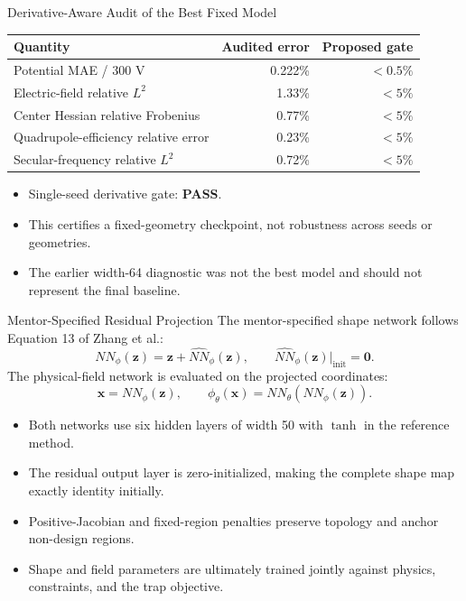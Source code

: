 \documentclass[aspectratio=169,professionalfonts]{beamer}
\begin{document}
\begin{frame}[t]{Derivative-Aware Audit of the Best Fixed Model}
\small
\begin{tabular}{lrr}
\toprule
Quantity & Audited error & Proposed gate \\
\midrule
Potential MAE / 300 V & 0.222\% & $<0.5\%$ \\
Electric-field relative $L^2$ & 1.33\% & $<5\%$ \\
Center Hessian relative Frobenius & 0.77\% & $<5\%$ \\
Quadrupole-efficiency relative error & 0.23\% & $<5\%$ \\
Secular-frequency relative $L^2$ & 0.72\% & $<5\%$ \\
\bottomrule
\end{tabular}
\vspace{0.12in}
\begin{itemize}
\item Single-seed derivative gate: \textbf{PASS}.
\item This certifies a fixed-geometry checkpoint, not robustness across seeds or geometries.
\item The earlier width-64 diagnostic was not the best model and should not represent the final baseline.
\end{itemize}
\end{frame}

\begin{frame}[t]{Mentor-Specified Residual Projection}
The mentor-specified shape network follows Equation 13 of Zhang et al.:
\[
NN_\phi(\mathbf{z})=\mathbf{z}+\widehat{NN}_\phi(\mathbf{z}),
\qquad
\widehat{NN}_\phi(\mathbf{z})\big|_{\mathrm{init}}=\mathbf{0}.
\]
The physical-field network is evaluated on the projected coordinates:
\[
\mathbf{x}=NN_\phi(\mathbf{z}),
\qquad
\phi_\theta(\mathbf{x})=NN_\theta(NN_\phi(\mathbf{z})).
\]
\begin{itemize}
\item Both networks use six hidden layers of width 50 with $\tanh$ in the reference method.
\item The residual output layer is zero-initialized, making the complete shape map exactly identity initially.
\item Positive-Jacobian and fixed-region penalties preserve topology and anchor non-design regions.
\item Shape and field parameters are ultimately trained jointly against physics, constraints, and the trap objective.
\end{itemize}
\end{frame}
\end{document}
